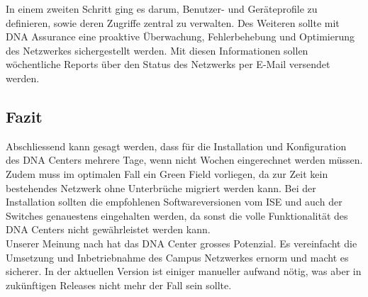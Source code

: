 In einem zweiten Schritt ging es darum, Benutzer- und Geräteprofile zu definieren, sowie deren Zugriffe zentral zu verwalten. Des Weiteren sollte mit DNA Assurance eine proaktive Überwachung, Fehlerbehebung und Optimierung des Netzwerkes sichergestellt werden. Mit diesen Informationen sollen wöchentliche Reports über den Status des Netzwerks per E-Mail versendet werden.

\subsection{Fazit}
Abschliessend kann gesagt werden, dass für die Installation und Konfiguration des DNA Centers mehrere Tage, wenn nicht Wochen eingerechnet werden müssen. Zudem muss im optimalen Fall ein Green Field vorliegen, da zur Zeit kein bestehendes Netzwerk ohne Unterbrüche migriert werden kann. Bei der Installation sollten die empfohlenen Softwareversionen vom ISE und auch der Switches genauestens eingehalten werden, da sonst die volle Funktionalität des DNA Centers nicht gewährleistet werden kann. \\
Unserer Meinung nach hat das DNA Center grosses Potenzial. Es vereinfacht die Umsetzung und Inbetriebnahme des Campus Netzwerkes ernorm und macht es sicherer. In der aktuellen Version ist einiger manueller aufwand nötig, was aber in zukünftigen Releases nicht mehr der Fall sein sollte.